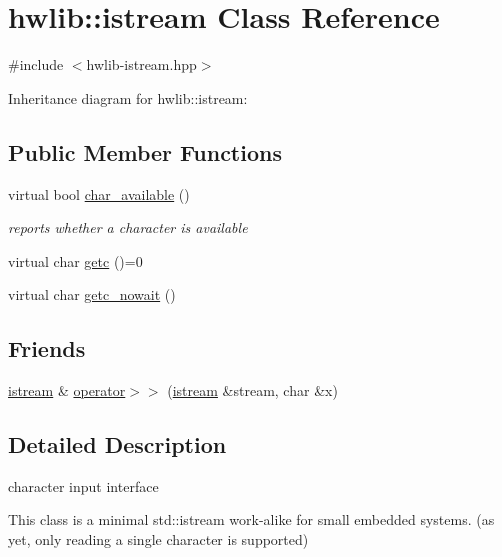\hypertarget{classhwlib_1_1istream}{}\section{hwlib\+:\+:istream Class Reference}
\label{classhwlib_1_1istream}


{\ttfamily \#include $<$hwlib-\/istream.\+hpp$>$}



Inheritance diagram for hwlib\+:\+:istream\+:
\subsection*{Public Member Functions}
\begin{DoxyCompactItemize}
\item 
\mbox{\label{classhwlib_1_1istream_a77c1ce784f42922cd4758f2d8a6c59b3}} 
virtual bool \hyperlink{classhwlib_1_1istream_a77c1ce784f42922cd4758f2d8a6c59b3}{char\+\_\+available} ()
\begin{DoxyCompactList}\small\item\em reports whether a character is available \end{DoxyCompactList}\item 
virtual char \hyperlink{classhwlib_1_1istream_a9a260f800b08d4788b9e399f65d1c728}{getc} ()=0
\item 
virtual char \hyperlink{classhwlib_1_1istream_aa4ff0ebb0bd23b9fb765520aa49416f4}{getc\+\_\+nowait} ()
\end{DoxyCompactItemize}
\subsection*{Friends}
\begin{DoxyCompactItemize}
\item 
\hyperlink{classhwlib_1_1istream}{istream} \& \hyperlink{classhwlib_1_1istream_a88dabf0f321a5f098ede5ee108d0a92b}{operator$>$$>$} (\hyperlink{classhwlib_1_1istream}{istream} \&stream, char \&x)
\end{DoxyCompactItemize}


\subsection{Detailed Description}
character input interface

This class is a minimal std\+::istream work-\/alike for small embedded systems. (as yet, only reading a single character is supported)


